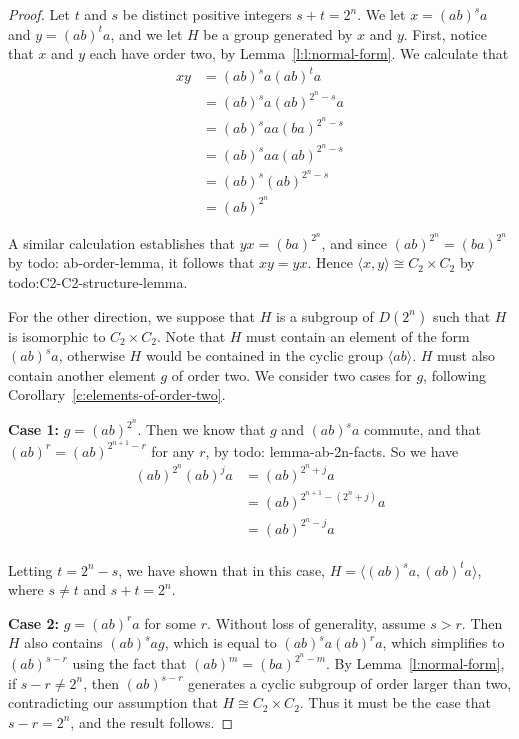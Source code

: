 \documentclass{amsart}
\numberwithin{equation} {section}
\theoremstyle{definition}
\begin{document}
\begin{proof}
Let $t$ and $s$ be distinct positive integers $s + t = 2^n$. We let $x = (ab)^sa$ and $y = (ab)^ta$, and we let $H$ be a group generated by $x$ and $y$. First, notice that $x$ and $y$ each have order two, by Lemma~\ref{l:l:normal-form}. We calculate that
\begin{align*}
xy &= (ab)^sa(ab)^ta \\
&= (ab)^s a (ab)^{2^n - s} a \\
&= (ab)^s a a (ba)^{2^n - s} \\
&= (ab)^s a a (ab)^{2^n - s} \\
&= (ab)^s (ab)^{2^n - s} \\
&= (ab)^{2^n} 
\end{align*}

A similar calculation establishes that $yx = (ba)^{2^n}$, and since $(ab)^{2^n} = (ba)^{2^n}$ by todo: ab-order-lemma, it follows that $xy = yx$. Hence $\langle x, y \rangle \cong C_2 \times C_2$ by todo:C2-C2-structure-lemma. 

For the other direction, we suppose that $H$ is a subgroup of $D(2^n)$ such that $H$ is isomorphic to $C_2 \times C_2$. Note that $H$ must contain an element of the form $(ab)^sa$, otherwise $H$ would be contained in the cyclic group $\langle ab \rangle$. $H$ must also contain another element $g$ of order two. We consider two cases for $g$, following Corollary~\ref{c:elements-of-order-two}. 

\textbf{Case 1:} $g = (ab)^{2^n}$. Then we know that $g$ and $(ab)^sa$ commute, and that  $(ab)^r = (ab)^{2^{n+1} - r}$ for any $r$, by todo: lemma-ab-2n-facts. So we have
\begin{align*}
(ab)^{2^n}(ab)^j a &= (ab)^{2^n +j} a \\
&= (ab)^{2^{n+1} - (2^n + j)} a\\
&= (ab)^{2^n - j} a \\
\end{align*}

Letting $t = 2^n - s$, we have shown that in this case, $H = \langle (ab)^s a, (ab)^t a \rangle$, where $s \neq t$ and $s + t = 2^n$.

\textbf{Case 2:} $g = (ab)^r a $ for some $r$. Without loss of generality, assume $s > r$. Then $H$ also contains $(ab)^s a g$, which is equal to $(ab)^s a (ab)^r a$, which simplifies to $(ab)^{s-r}$ using the fact that $(ab)^m = (ba)^{2^n - m}$. By Lemma~\ref{l:normal-form}, if $s-r \neq 2^n$, then $(ab)^{s-r}$ generates a cyclic subgroup of order larger than two, contradicting our assumption that $H \cong C_2 \times C_2$. Thus it must be the case that $s-r = 2^n$, and the result follows. 
\end{proof}
\end{document}
